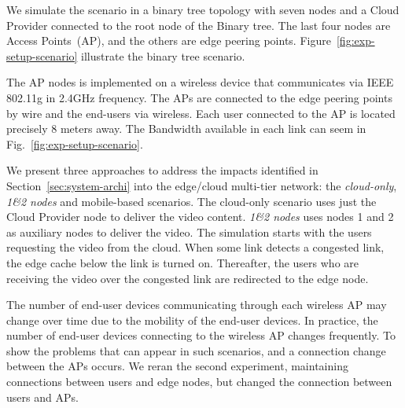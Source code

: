 

We simulate the scenario in a binary tree topology with seven nodes and a Cloud Provider connected to the root node of the Binary tree. The last four nodes are Access Points~(AP), and the others are edge peering points. Figure~\ref{fig:exp-setup-scenario} illustrate the binary tree scenario.

The AP nodes is implemented on a wireless device that communicates via IEEE 802.11g in 2.4GHz frequency. The APs are connected to the edge peering points by wire and the end-users via wireless. Each user connected to the AP is located precisely 8 meters away. The Bandwidth available in each link can seem in Fig.~\ref{fig:exp-setup-scenario}.

We present three approaches to address the impacts identified in Section~\ref{sec:system-archi} into the edge/cloud multi-tier network: the \textit{cloud-only}, \textit{1\&2 nodes} and mobile-based scenarios. The cloud-only scenario uses just the Cloud Provider node to deliver the video content. \textit{1\&2 nodes} uses nodes 1 and 2 as auxiliary nodes to deliver the video. The simulation starts with the users requesting the video from the cloud. When some link detects a congested link, the edge cache below the link is turned on. Thereafter, the users who are receiving the video over the congested link are redirected to the edge node. 

The number of end-user devices communicating through each wireless AP may change over time due to the mobility of the end-user devices. In practice, the number of end-user devices connecting to the wireless AP changes frequently. 
To show the problems that can appear in such scenarios, and a connection change between the APs occurs. We reran the second experiment, maintaining connections between users and edge nodes, but changed the connection between users and APs.



